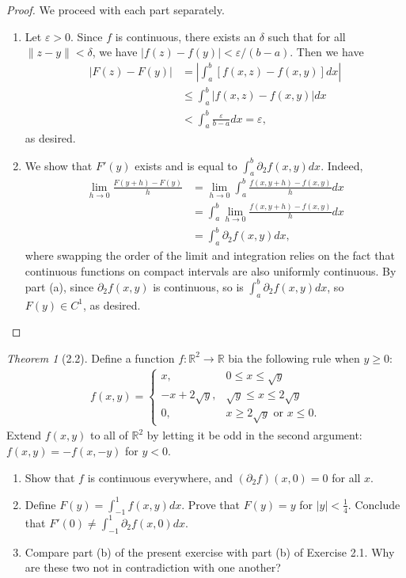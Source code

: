 \documentclass[12pt]{article}
\theoremstyle{remark}
\theoremstyle{named}
\newtheorem*{theorem}{Theorem}
\renewcommand{\d}{\delta}
\newcommand{\e}{\varepsilon}
\newcommand{\R}{\mathbb R}
\newcommand{\abs}[1]{|#1|}
\newcommand{\bigabs}[1]{\left|#1\right|}
\begin{document}
\begin{proof}
    We proceed with each part separately.
    \begin{enumerate}
        \item Let \(\e > 0\). Since \(f\) is continuous, there exists an \(\d\) such that for all \(\|z - y\| < \d\), we have \(|f(z) - f(y)| < \e / (b - a)\). Then we have 
        \begin{align*}
            |F(z) - F(y)| &= \bigabs{\int_{a}^{b} [f(x, z) - f(x, y)] dx} \\
            &\leq \int_{a}^{b} \abs{f(x, z) - f(x, y)} dx \\
            &< \int_{a}^{b} \frac{\e}{b - a} dx = \e,
        \end{align*}
        as desired.
        \item We show that \(F'(y)\) exists and is equal to \(\int_{a}^{b} \partial_2 f(x, y) dx\). Indeed,
        \begin{align*}
            \lim_{h \to 0} \frac{F(y + h) - F(y)}{h} &= \lim_{h \to 0} \int_{a}^{b} \frac{f(x, y + h) - f(x, y)}{h} dx \\
            &= \int_{a}^{b} \lim_{h \to 0} \frac{f(x, y + h) - f(x, y)}{h} dx \\
            &= \int_{a}^{b} \partial_2 f(x, y) dx,
        \end{align*}
        where swapping the order of the limit and integration relies on the fact that continuous functions on compact intervals are also uniformly continuous. By part (a), since \(\partial_2 f(x, y)\) is continuous, so is \(\int_{a}^{b} \partial_2 f(x, y) dx\), so \(F(y) \in C^1\), as desired.
    \end{enumerate}
\end{proof}

\begin{theorem}[2.2]
    Define a function \(f : \R^2 \to \R\) bia the following rule when \(y \geq 0\):
    \begin{align*}
        f(x, y) = 
        \begin{cases}
            x, & 0 \leq x \leq \sqrt{y} \\
            -x + 2\sqrt{y}, & \sqrt{y} \leq x \leq 2\sqrt{y} \\
            0, & x \geq 2\sqrt{y} \text{ or } x \leq 0. 
        \end{cases}
    \end{align*}
    Extend \(f(x, y)\) to all of \(\R^2\) by letting it be odd in the second argument: \(f(x, y) = -f(x, -y)\) for \(y < 0\).
    \begin{enumerate}
        \item Show that \(f\) is continuous everywhere, and \((\partial_2 f)(x, 0) = 0\) for all \(x\).
        \item Define \(F(y) = \int_{-1}^{1} f(x, y) dx\). Prove that \(F(y) = y\) for \(\abs{y} < \frac 1 4\). Conclude that \(F'(0) \neq \int_{-1}^{1}\partial_2 f(x, 0) dx\).
        \item Compare part (b) of the present exercise with part (b) of Exercise 2.1. Why are these two not in contradiction with one another?
    \end{enumerate}
\end{theorem}
\end{document}
